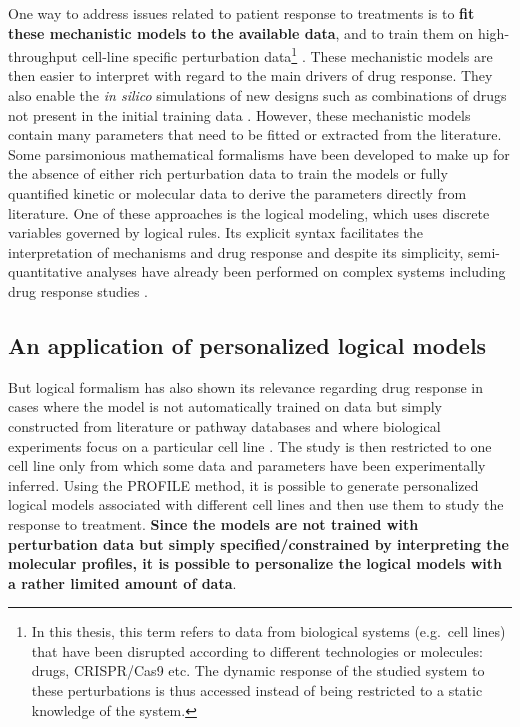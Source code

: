 \documentclass[a4paper,12pt,twoside,onecolumn,openright,final,oldfontcommands]{memoir}
\begin{document}
One way to address issues related to patient response to treatments is
to \textbf{fit these mechanistic models to the available data}, and to
train them on high-throughput cell-line specific perturbation
data\footnote{In this thesis, this term refers to data from biological
  systems (e.g.~cell lines) that have been disrupted according to
  different technologies or molecules: drugs, CRISPR/Cas9 etc. The
  dynamic response of the studied system to these perturbations is thus
  accessed instead of being restricted to a static knowledge of the
  system.}
\citep{eduati2017drug, jastrzebski2018integrative, klinger2013network}.
These mechanistic models are then easier to interpret with regard to the
main drivers of drug response. They also enable the \emph{in silico}
simulations of new designs such as combinations of drugs not present in
the initial training data \citep{frohlich2018efficient}. However, these
mechanistic models contain many parameters that need to be fitted or
extracted from the literature. Some parsimonious mathematical formalisms
have been developed to make up for the absence of either rich
perturbation data to train the models or fully quantified kinetic or
molecular data to derive the parameters directly from literature. One of
these approaches is the logical modeling, which uses discrete variables
governed by logical rules. Its explicit syntax facilitates the
interpretation of mechanisms and drug response
\citep{zanudo2017network, iorio2016landscape} and despite its
simplicity, semi-quantitative analyses have already been performed on
complex systems including drug response studies
\citep{knijnenburg2016logic, eduati2020patient}.

\subsection{An application of personalized logical
models}\label{an-application-of-personalized-logical-models}

But logical formalism has also shown its relevance regarding drug
response in cases where the model is not automatically trained on data
but simply constructed from literature or pathway databases and where
biological experiments focus on a particular cell line
\citep{flobak2015discovery}. The study is then restricted to one cell
line only from which some data and parameters have been experimentally
inferred. Using the PROFILE method, it is possible to generate
personalized logical models associated with different cell lines and
then use them to study the response to treatment. \textbf{Since the
models are not trained with perturbation data but simply
specified/constrained by interpreting the molecular profiles, it is
possible to personalize the logical models with a rather limited amount
of data}.
\end{document}
